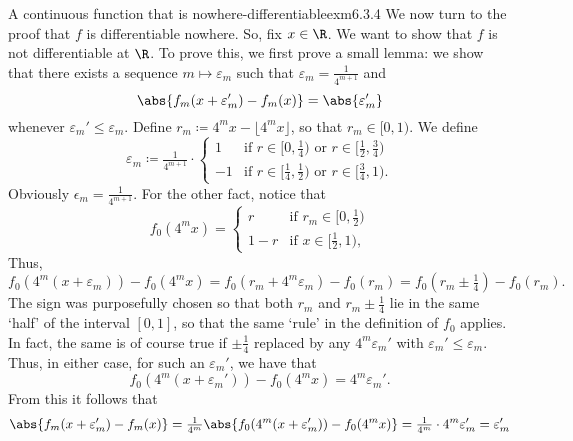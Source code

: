 \begin{exm}{A continuous function that is nowhere-differentiable}{exm6.3.4}
We now turn to the proof that $f$ is differentiable nowhere.  So, fix $x\in \R$.  We want to show that $f$ is not differentiable at $\R$.  To prove this, we first prove a small lemma:  we show that there exists a sequence $m\mapsto \varepsilon _m$ such that $\varepsilon _m=\frac{1}{4^{m+1}}$ and
\begin{equation}
\abs{f_m(x+\varepsilon _m')-f_m(x)}=\abs{\varepsilon _m'}
\end{equation}
whenever $\varepsilon _m'\leq \varepsilon _m$.  Define $r_m\coloneqq 4^mx-\lfloor 4^mx\rfloor$, so that $r_m\in [0,1)$.  We define
\begin{equation}
\varepsilon _m\coloneqq \tfrac{1}{4^{m+1}}\cdot \begin{cases}1 & \text{if }r\in [0,\tfrac{1}{4})\text{ or }r\in [\tfrac{1}{2},\tfrac{3}{4}) \\ -1 & \text{if }r\in [\tfrac{1}{4},\tfrac{1}{2})\text{ or }r\in [\tfrac{3}{4},1).\end{cases}
\end{equation}
Obviously $\epsilon _m=\frac{1}{4^{m+1}}$.  For the other fact, notice that
\begin{equation}
f_0(4^mx)=\begin{cases}r & \text{if }r_m\in [0,\tfrac{1}{2}) \\ 1-r & \text{if }x\in [\tfrac{1}{2},1),\end{cases}
\end{equation}
Thus,
\begin{equation}
f_0(4^m(x+\varepsilon _m))-f_0(4^mx)=f_0(r_m+4^m\varepsilon _m)-f_0(r_m)=f_0(r_m\pm \tfrac{1}{4})-f_0(r_m).
\end{equation}
The sign was purposefully chosen so that both $r_m$ and $r_m\pm \frac{1}{4}$ lie in the same `half' of the interval $[0,1]$, so that the same `rule' in the definition of $f_0$ applies.  In fact, the same is of course true if $\pm \tfrac{1}{4}$ replaced by any $4^m\varepsilon _m'$ with $\varepsilon _m'\leq \varepsilon _m$.  Thus, in either case, for such an $\varepsilon _m'$, we have that
\begin{equation}
f_0(4^m(x+\varepsilon _m'))-f_0(4^mx)=4^m\varepsilon _m'.
\end{equation}
From this it follows that
\begin{equation}
\abs{f_m(x+\varepsilon _m')-f_m(x)}=\tfrac{1}{4^m}\abs{f_0(4^m(x+\varepsilon _m'))-f_0(4^mx)}=\tfrac{1}{4^m}\cdot 4^m\varepsilon _m'=\varepsilon _m'
\end{equation}


\end{exm}
